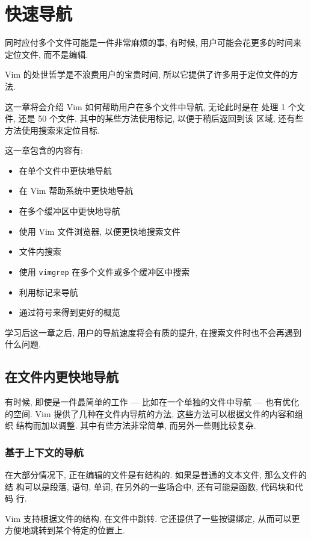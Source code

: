 \chapter{快速导航}
\label{chap:better_navigation}
同时应付多个文件可能是一件非常麻烦的事, 有时候, 用户可能会花更多的时间来
定位文件, 而不是编辑.

Vim 的处世哲学是不浪费用户的宝贵时间, 所以它提供了许多用于定位文件的方法.

这一章将会介绍 Vim 如何帮助用户在多个文件中导航, 无论此时是在
处理 1 个文件, 还是 50 个文件. 其中的某些方法使用标记, 以便于稍后返回到该
区域, 还有些方法使用搜索来定位目标.

这一章包含的内容有:
\begin{itemize}
    \item 在单个文件中更快地导航
    \item 在 Vim 帮助系统中更快地导航
    \item 在多个缓冲区中更快地导航
    \item 使用 Vim 文件浏览器, 以便更快地搜索文件
    \item 文件内搜索
    \item 使用 \texttt{vimgrep} 在多个文件或多个缓冲区中搜索
    \item 利用标记来导航
    \item 通过符号来得到更好的概览
\end{itemize}

学习后这一章之后, 用户的导航速度将会有质的提升, 在搜索文件时也不会再遇到
什么问题.
\section{在文件内更快地导航}
\label{sec:faster_navigation_in_a_file}

有时候, 即使是一件最简单的工作 --- 比如在一个单独的文件中导航 --- 也有优化
的空间. Vim 提供了几种在文件内导航的方法, 这些方法可以根据文件的内容和组织
结构而加以调整. 其中有些方法非常简单, 而另外一些则比较复杂.

\subsection{基于上下文的导航}
\label{subsec:context_aware_navigation}

在大部分情况下, 正在编辑的文件是有结构的. 如果是普通的文本文件, 那么文件的结
构可以是段落, 语句, 单词, 在另外的一些场合中, 还有可能是函数, 代码块和代码
行.

Vim 支持根据文件的结构, 在文件中跳转. 它还提供了一些按键绑定, 从而可以更
方便地跳转到某个特定的位置上.

